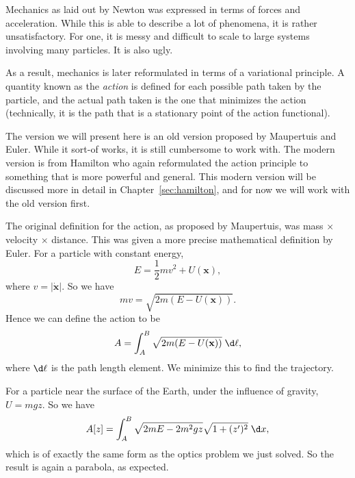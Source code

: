\documentclass[a4paper]{article}
\begin{document}
\begin{eg}
  Mechanics as laid out by Newton was expressed in terms of forces and acceleration. While this is able to describe a lot of phenomena, it is rather unsatisfactory. For one, it is messy and difficult to scale to large systems involving many particles. It is also ugly.

  As a result, mechanics is later reformulated in terms of a variational principle. A quantity known as the \emph{action} is defined for each possible path taken by the particle, and the actual path taken is the one that minimizes the action (technically, it is the path that is a stationary point of the action functional).

  The version we will present here is an old version proposed by Maupertuis and Euler. While it sort-of works, it is still cumbersome to work with. The modern version is from Hamilton who again reformulated the action principle to something that is more powerful and general. This modern version will be discussed more in detail in Chapter~\ref{sec:hamilton}, and for now we will work with the old version first.

  The original definition for the action, as proposed by Maupertuis, was mass $\times$ velocity $\times$ distance. This was given a more precise mathematical definition by Euler. For a particle with constant energy,
  \[
    E = \frac{1}{2} mv^2 + U(\mathbf{x}),
  \]
  where $v = |\dot{\mathbf{x}}|$. So we have
  \[
    mv = \sqrt{2m(E - U(\mathbf{x}))}.
  \]
  Hence we can define the action to be
  \[
    A = \int_A^B \sqrt{2m(E - U(\mathbf{x}))}\;\d \ell,
  \]
  where $\d\ell$ is the path length element. We minimize this to find the trajectory.

  For a particle near the surface of the Earth, under the influence of gravity, $U = mgz$. So we have
  \[
    A[z] = \int_A^B \sqrt{2mE - 2m^2gz}\sqrt{1 + (z')^2}\;\d x,
  \]
  which is of exactly the same form as the optics problem we just solved. So the result is again a parabola, as expected.
\end{eg}
\end{document}
